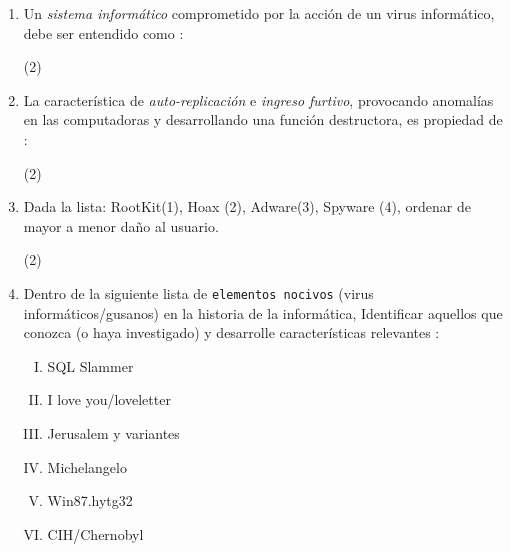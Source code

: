 \documentclass[10pt, a4paper]{article}
\begin{document}
\begin{enumerate}
{\begin{tasks}(2)
\end{tasks}
}
\item{Un \emph{sistema informático} comprometido por la acción de un virus informático, debe ser entendido como :
\begin{tasks}(2)
\end{tasks}
}
\item{La característica de \emph{auto-replicación} e \emph{ingreso furtivo}, provocando anomalías en las computadoras y desarrollando una función destructora, es propiedad de :
\begin{tasks}(2)
\end{tasks}
}
\item{Dada la lista: RootKit(1), Hoax (2), Adware(3), Spyware (4), ordenar de mayor a menor daño al usuario. 
\begin{tasks}(2)
\end{tasks}
}
\item{Dentro de la siguiente lista de {\tt elementos nocivos} (virus informáticos/gusanos) en la historia de la informática, Identificar aquellos que conozca (o haya investigado)  y desarrolle características relevantes :
\begin{enumerate}[I.]
\item{SQL Slammer}
\item{I love you/loveletter}
\item{Jerusalem y variantes}
\item{Michelangelo}
\item{Win87.hytg32}
\item{CIH/Chernobyl}
\end{enumerate}
}
\end{enumerate}
\end{document}
